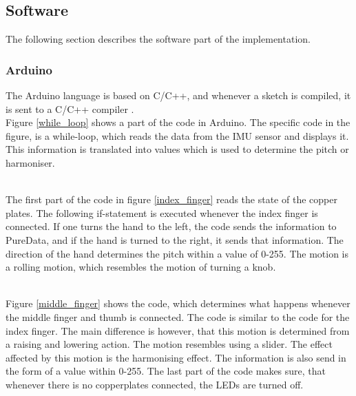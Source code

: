 \subsection{Software}

The following section describes the software part of the implementation. 

\subsubsection{Arduino}
The Arduino language is based on C/C++, and whenever a sketch is compiled, it is sent to a C/C++ compiler \citep{Arduino_FAQ}.\\

Figure \ref{while_loop} shows a part of the code in Arduino. The specific code in the figure, is a while-loop, which reads the data from the IMU sensor and displays it.
This information is translated into values which is used to determine the pitch or harmoniser. \\

\begin{minipage}{\linewidth}%
\label{while_loop}
\end{minipage}\\

The first part of the code in figure \ref{index_finger} reads the state of the copper plates. The following if-statement is executed whenever the index finger is connected. 
If one turns the hand to the left, the code sends the information to PureData, and if the hand is turned to the right, it sends that information. 
The direction of the hand determines the pitch within a value of 0-255. The motion is a rolling motion, which resembles the motion of turning a knob. \\ 


\begin{minipage}{\linewidth}%
\label{index_finger}
\end{minipage}\\

Figure \ref{middle_finger} shows the code, which determines what happens whenever the middle finger and thumb is connected. The code is similar to the code for the index finger.
The main difference is however, that this motion is determined from a raising and lowering action. The motion resembles using a slider. The effect affected by this motion is the harmonising effect. 
The information is also send in the form of a value within 0-255. 
The last part of the code makes sure, that whenever there is no copperplates connected, the LEDs are turned off.\\ 

